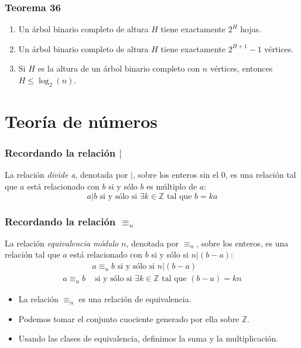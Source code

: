 \begin{multicols}{2}
    \subsubsection*{Teorema 36}
    \begin{enumerate}
        \item Un árbol binario completo de altura $H$ tiene exactamente $2^H$ hojas.
        \item Un árbol binario completo de altura $H$ tiene exactamente $2^{H + 1} - 1$ vértices.
        \item Si $H$ es la altura de un árbol binario completo con $n$ vértices, entonces $H \leq \log_2(n)$.
    \end{enumerate}
    
    \section{Teoría de números}
    \subsubsection*{Recordando la relación $|$}
    La relación \textit{divide a}, denotada por $|$, sobre los enteros sin el 0, es una relación tal que $a$ está relacionado con $b$ si y sólo $b$ es múltiplo de $a$:
    $$
    a|b \text{ si y sólo si } \exists k \in \mathbb{Z} \text{ tal que } b = ka
    $$
    
    \subsubsection*{Recordando la relación $\equiv_n$}
    La relación \textit{equivalencia módulo} $n$, denotada por $\equiv_n$, sobre los enteros, es una relación tal que $a$ está relacionado con $b$ si y sólo si $n|(b - a)$:
    \begin{align*}
        &a \equiv_n b \text{ si y sólo si } n|(b - a) \\
        a \equiv_n b &\text{ si y sólo si } \exists k \in \mathbb{Z} \text{ tal que } (b - a) = kn
    \end{align*}
    \begin{itemize}
        \item La relación $\equiv_n$ es una relación de equivalencia.
        \item Podemos tomar el conjunto cuociente generado por ella sobre $\mathbb{Z}$.
        \item Usando las clases de equivalencia, definimos la suma y la multiplicación.
    \end{itemize}
    

\end{multicols}
